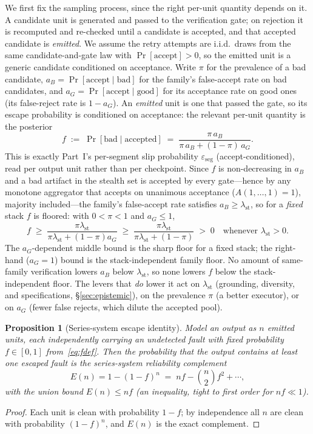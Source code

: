 \documentclass[11pt]{article}
\newtheorem{proposition}{Proposition}
\theoremstyle{definition}
\theoremstyle{remark}
\newcommand{\lst}{\lambda_{\mathrm{st}}}
\newcommand{\eseg}{\varepsilon_{\mathrm{seg}}}
\newcommand{\Esc}{E}
\newcommand{\fesc}{f}
\begin{document}
We first fix the sampling process, since the right per-unit quantity depends on it. A candidate unit
is generated and passed to the verification gate; on rejection it is recomputed and re-checked until a
candidate is accepted, and that accepted candidate is \emph{emitted}. We assume the retry attempts are
i.i.d.\ draws from the same candidate-and-gate law with $\Pr[\text{accept}]>0$, so the emitted unit is a
generic candidate conditioned on acceptance. Write $\pi$ for the prevalence of
a bad candidate, $a_B=\Pr[\text{accept}\mid\text{bad}]$ for the family's false-accept rate on bad
candidates, and $a_G=\Pr[\text{accept}\mid\text{good}]$ for its acceptance rate on good ones (its
false-reject rate is $1-a_G$). An \emph{emitted} unit is one that passed the gate, so its escape
probability is conditioned on acceptance: the relevant per-unit quantity is the posterior
\begin{equation}\label{eq:fdef}
\fesc\;:=\;\Pr[\text{bad}\mid\text{accepted}]\;=\;\frac{\pi\,a_B}{\pi\,a_B+(1-\pi)\,a_G}.
\end{equation}
This is exactly Part~I's per-segment slip probability $\eseg$ (accept-conditioned), read per output unit
rather than per checkpoint. Since $\fesc$ is non-decreasing in $a_B$ and a bad artifact in the stealth set
is accepted by every gate---hence by any monotone aggregator that accepts on unanimous acceptance
($A(1,\dots,1)=1$), majority included---the family's false-accept rate satisfies $a_B\ge\lst$, so for a
\emph{fixed} stack $\fesc$ is floored: with $0<\pi<1$ and $a_G\le1$,
\begin{equation}\label{eq:ffloor}
\fesc\;\ge\;\frac{\pi\lst}{\pi\lst+(1-\pi)a_G}\;\ge\;\frac{\pi\lst}{\pi\lst+(1-\pi)}\;>\;0\quad\text{whenever }\lst>0.
\end{equation}
The $a_G$-dependent middle bound is the sharp floor for a fixed stack; the right-hand ($a_G=1$) bound is
the stack-independent family floor. No amount of same-family verification lowers $a_B$ below $\lst$, so
none lowers $\fesc$ below the stack-independent floor. The levers that \emph{do} lower it act on $\lst$
(grounding, diversity, and specifications, \S\ref{sec:epistemic}), on the prevalence $\pi$ (a better
executor), or on $a_G$ (fewer false rejects, which dilute the accepted pool).

\begin{proposition}[Series-system escape identity]\label{thm:escape}
Model an output as $n$ emitted units, each independently carrying an undetected fault with fixed
probability $\fesc\in[0,1]$ from~\eqref{eq:fdef}. Then the probability that the output contains at least
one escaped fault is the series-system reliability complement
\begin{equation}\label{eq:escape}
\Esc(n)=1-(1-\fesc)^n\;=\;n\fesc-\binom{n}{2}\fesc^2+\cdots,
\end{equation}
with the union bound $\Esc(n)\le n\fesc$ (an inequality, tight to first order for $n\fesc\ll1$).
\end{proposition}
\begin{proof}
Each unit is clean with probability $1-\fesc$; by independence all $n$ are clean with probability
$(1-\fesc)^n$, and $\Esc(n)$ is the exact complement.
\end{proof}
\end{document}

